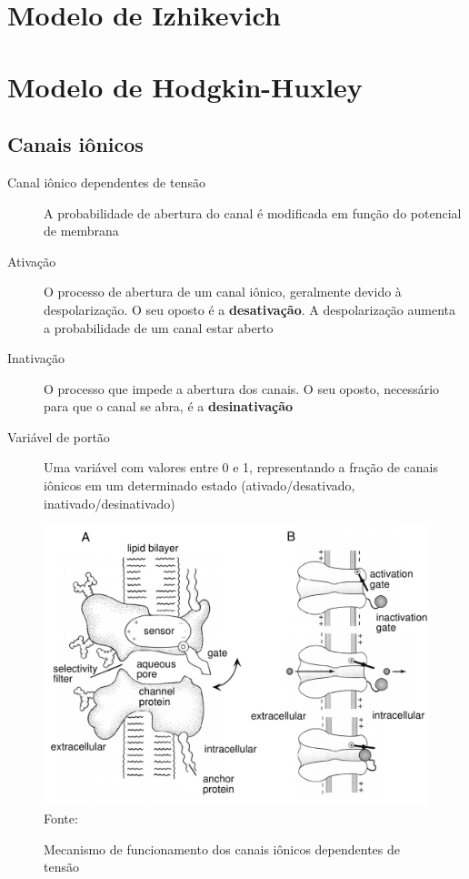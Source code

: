 \section{Modelo de Izhikevich}\label{sec:izhikevich}

\section{Modelo de Hodgkin-Huxley}\label{sec:modelohh}
\subsection{Canais iônicos}
\nocite{miller_introductory_2018}
\begin{description}
	\item[Canal iônico dependentes de tensão] A probabilidade de abertura do canal é modificada em função do potencial de membrana
	\item[Ativação] O processo de abertura de um canal iônico, geralmente devido à despolarização. O seu oposto é a \textbf{desativação}. A despolarização aumenta a probabilidade de um canal estar aberto
	\item[Inativação] O processo que impede a abertura dos canais. O seu oposto, necessário para que o canal se abra, é a \textbf{desinativação}
	\item[Variável de portão] Uma variável com valores entre 0 e 1, representando a fração de canais iônicos em um determinado estado (ativado/desativado, inativado/desinativado)
\end{description}

\begin{figure}[h!]
	\centering
	\caption{Mecanismo de funcionamento dos canais iônicos dependentes de tensão}
	\label{fig:canais}
	\includegraphics[width=0.6\linewidth]{figs/canais}\\
	\small{Fonte: \cite{dayan_theoretical_2001}}
\end{figure}


